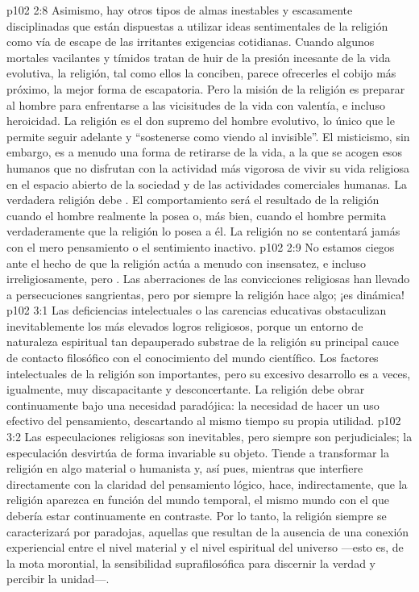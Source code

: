 \vs p102 2:8 Asimismo, hay otros tipos de almas inestables y escasamente disciplinadas que están dispuestas a utilizar ideas sentimentales de la religión como vía de escape de las irritantes exigencias cotidianas. Cuando algunos mortales vacilantes y tímidos tratan de huir de la presión incesante de la vida evolutiva, la religión, tal como ellos la conciben, parece ofrecerles el cobijo más próximo, la mejor forma de escapatoria. Pero la misión de la religión es preparar al hombre para enfrentarse a las vicisitudes de la vida con valentía, e incluso heroicidad. La religión es el don supremo del hombre evolutivo, lo único que le permite seguir adelante y “sostenerse como viendo al invisible”. El misticismo, sin embargo, es a menudo una forma de retirarse de la vida, a la que se acogen esos humanos que no disfrutan con la actividad más vigorosa de vivir su vida religiosa en el espacio abierto de la sociedad y de las actividades comerciales humanas. La verdadera religión debe . El comportamiento será el resultado de la religión cuando el hombre realmente la posea o, más bien, cuando el hombre permita verdaderamente que la religión lo posea a él. La religión no se contentará jamás con el mero pensamiento o el sentimiento inactivo.
\vs p102 2:9 No estamos ciegos ante el hecho de que la religión actúa a menudo con insensatez, e incluso irreligiosamente, pero . Las aberraciones de las convicciones religiosas han llevado a persecuciones sangrientas, pero por siempre la religión hace algo; ¡es dinámica!
\vs p102 3:1 Las deficiencias intelectuales o las carencias educativas obstaculizan inevitablemente los más elevados logros religiosos, porque un entorno de naturaleza espiritual tan depauperado substrae de la religión su principal cauce de contacto filosófico con el conocimiento del mundo científico. Los factores intelectuales de la religión son importantes, pero su excesivo desarrollo es a veces, igualmente, muy discapacitante y desconcertante. La religión debe obrar continuamente bajo una necesidad paradójica: la necesidad de hacer un uso efectivo del pensamiento, descartando al mismo tiempo su propia utilidad.
\vs p102 3:2 Las especulaciones religiosas son inevitables, pero siempre son perjudiciales; la especulación desvirtúa de forma invariable su objeto. Tiende a transformar la religión en algo material o humanista y, así pues, mientras que interfiere directamente con la claridad del pensamiento lógico, hace, indirectamente, que la religión aparezca en función del mundo temporal, el mismo mundo con el que debería estar continuamente en contraste. Por lo tanto, la religión siempre se caracterizará por paradojas, aquellas que resultan de la ausencia de una conexión experiencial entre el nivel material y el nivel espiritual del universo ---esto es, de la mota morontial, la sensibilidad suprafilosófica para discernir la verdad y percibir la unidad---.
